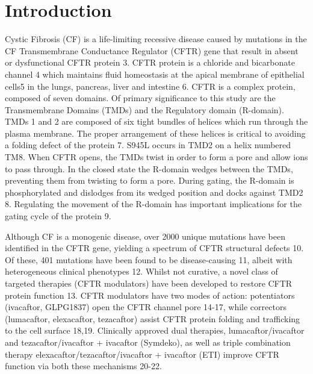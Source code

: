 \section{Introduction}
Cystic Fibrosis (CF) is a life-limiting recessive disease \cite{mall2014, elborn2016} caused by mutations in the CF Transmembrane Conductance Regulator (CFTR) gene that result in absent or dysfunctional CFTR protein \cite{rowe2005}3. CFTR protein is a chloride and bicarbonate channel \cite{veit2016}4 which maintains fluid homeostasis at the apical membrane of epithelial cells\cite{riordan1989}5 in the lungs, pancreas, liver and intestine \cite{ratjen2015}6. CFTR is a complex protein, composed of seven domains. Of primary significance to this study are the Transmembrane Domains (TMDs) and the Regulatory domain (R-domain). TMDs 1 and 2 are composed of six tight bundles of helices which run through the plasma membrane. The proper arrangement of these helices is critical to avoiding a folding defect of the protein \cite{fiedorczuk2022}7. S945L occurs in TMD2 on a helix numbered TM8. When CFTR opens, the TMDs twist in order to form a pore and allow ions to pass through. In the closed state the R-domain wedges between the TMDs, preventing them from twisting to form a pore. During gating, the R-domain is phosphorylated and dislodges from its wedged position and docks against TMD2 \cite{zhang2018}8. Regulating the movement of the R-domain has important implications for the gating cycle of the protein \cite{mihalyi2020}9.

Although CF is a monogenic disease, over 2000 unique mutations have been identified in the CFTR gene, yielding a spectrum of CFTR structural defects \cite{deboeck2016}10. Of these, 401 mutations have been found to be disease-causing \cite{cftr2}11, albeit with heterogeneous clinical phenotypes \cite{bonadia2014}12. Whilst not curative, a novel class of targeted therapies (CFTR modulators) have been developed to restore CFTR protein function \cite{awatade2018}13. CFTR modulators have two modes of action:  potentiators (ivacaftor, GLPG1837) open the CFTR channel pore \cite{vangoor2009, accurso2010, yu2012, rosenfeld2018}14-17, while correctors (lumacaftor, elexacaftor, tezacaftor) assist CFTR protein folding and trafficking to the cell surface \cite{lopes-pacheco2017, dekkers2016b}18,19. Clinically approved dual therapies, lumacaftor/ivacaftor and tezacaftor/ivacaftor + ivacaftor (Symdeko), as well as triple combination therapy elexacaftor/tezacaftor/ivacaftor + ivacaftor (ETI) improve CFTR function via both these mechanisms \cite{ wainwright2015,rowe2017, middleton2019}20-22. 

